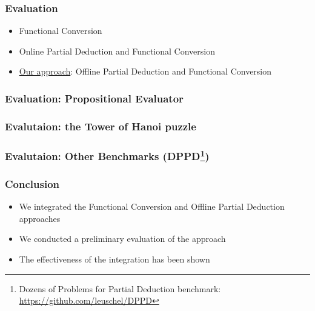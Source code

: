 \documentclass[xcolor=table, aspectratio=169]{beamer}
\begin{document}
\begin{frame}[fragile]
  \frametitle{Evaluation}
  \begin{itemize}
      \item Functional Conversion
      \item Online Partial Deduction and Functional Conversion
      \item \underline{Our approach}: Offline Partial Deduction and Functional Conversion
  \end{itemize}
  
\end{frame}


\begin{frame}[fragile]
  \frametitle{Evaluation: Propositional Evaluator}
  \begin{center}
    
  \end{center}
  
\end{frame}

\begin{frame}[fragile]
  \frametitle{Evalutaion: the Tower of Hanoi puzzle}
  \begin{center}
    
  \end{center}
\end{frame}

\begin{frame}[fragile]
  \frametitle{Evalutaion: Other Benchmarks (DPPD\footnote{Dozens of Problems for Partial Deduction benchmark: \url{https://github.com/leuschel/DPPD}})}
  \begin{center}
    
  \end{center}
\end{frame}


\begin{frame}[fragile]
  \frametitle{Conclusion}

  \begin{itemize}
      \item We integrated the Functional Conversion and Offline Partial Deduction approaches
      \item We conducted a preliminary evaluation of the approach
      \item The effectiveness of the integration has been shown
  \end{itemize}

  
\end{frame}

    
\end{document}
